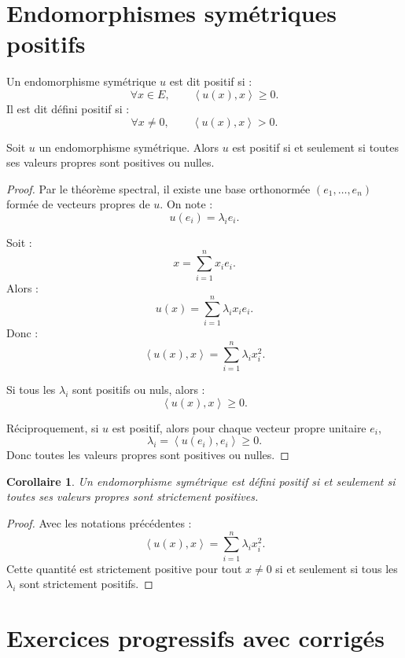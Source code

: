 \documentclass[11pt,a4paper]{article}
\newcommand{\scal}[2]{\left\langle #1,#2\right\rangle}
\newtheorem{corollaire}[prop]{Corollaire}
\begin{document}
\section{Endomorphismes symétriques positifs}

\begin{definitionbox}
Un endomorphisme symétrique \(u\) est dit positif si :
\[
\forall x\in E,\qquad \scal{u(x)}{x}\geq0.
\]
Il est dit défini positif si :
\[
\forall x\neq0,\qquad \scal{u(x)}{x}>0.
\]
\end{definitionbox}

\begin{theorembox}
Soit \(u\) un endomorphisme symétrique.  
Alors \(u\) est positif si et seulement si toutes ses valeurs propres sont positives ou nulles.
\end{theorembox}

\begin{proof}
Par le théorème spectral, il existe une base orthonormée \((e_1,\dots,e_n)\) formée de vecteurs propres de \(u\).  
On note :
\[
u(e_i)=\lambda_i e_i.
\]

Soit :
\[
x=\sum_{i=1}^n x_ie_i.
\]
Alors :
\[
u(x)=\sum_{i=1}^n \lambda_i x_ie_i.
\]
Donc :
\[
\scal{u(x)}{x}
=
\sum_{i=1}^n \lambda_i x_i^2.
\]

Si tous les \(\lambda_i\) sont positifs ou nuls, alors :
\[
\scal{u(x)}{x}\geq0.
\]

Réciproquement, si \(u\) est positif, alors pour chaque vecteur propre unitaire \(e_i\),
\[
\lambda_i=\scal{u(e_i)}{e_i}\geq0.
\]
Donc toutes les valeurs propres sont positives ou nulles.
\end{proof}

\begin{corollaire}
Un endomorphisme symétrique est défini positif si et seulement si toutes ses valeurs propres sont strictement positives.
\end{corollaire}

\begin{proof}
Avec les notations précédentes :
\[
\scal{u(x)}{x}
=
\sum_{i=1}^n \lambda_i x_i^2.
\]
Cette quantité est strictement positive pour tout \(x\neq0\) si et seulement si tous les \(\lambda_i\) sont strictement positifs.
\end{proof}

\section{Exercices progressifs avec corrigés}
\end{document}
